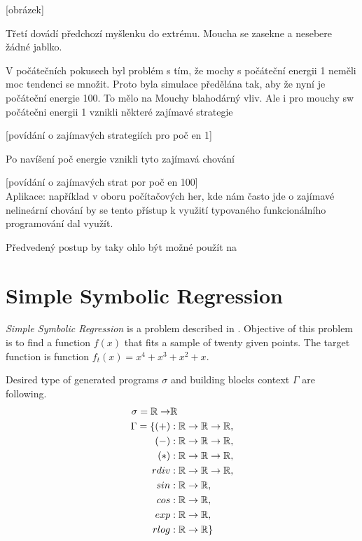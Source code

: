 \documentclass[12pt,a4paper]{report}
\begin{document}
[obrázek]

Třetí dovádí předchozí myšlenku do extrému. 
Moucha se zasekne a nesebere žádné jablko.


V počátečních pokusech byl problém s tím, že mochy s počáteční energii 1
neměli moc tendenci se množit. Proto byla simulace předělána tak, aby
že nyní je počáteční energie 100. To mělo na Mouchy blahodárný vliv.
Ale i pro mouchy sw počátečni energii 1 vznikli některé zajímavé strategie

[povídání o zajímavých strategiích pro poč en 1]

Po navíšení poč energie vznikli tyto zajímavá chování

[povídání o zajímavých strat por poč en 100]\\

Aplikace: například v oboru počítačových her, kde nám často jde o
zajímavé nelineární chování by se tento přístup k využití typovaného funkcionálního
programování dal využít.

Předvedený postup by taky ohlo být možné použít na 

\section{Simple Symbolic Regression}

\textit{Simple Symbolic Regression} is a problem described
in \cite{koza92}. Objective of this problem is to 
find a function $f(x)$ that fits a sample
of twenty given points. The target function is 
function $f_{t}(x) = x^4 + x^3 + x^2 + x$.  

Desired type of generated programs $\sigma$ and 
building blocks context $\Gamma$ are following.
\newcommand{\Real}{\mathbb{R}}
\begin{align*}
\sigma = \Real \ar &\Real\\
\Gamma = \{
  (+)  &: \Real \ar \Real \ar \Real    ,\\
  (-)  &: \Real \ar \Real \ar \Real    ,\\
  (*)  &: \Real \ar \Real \ar \Real    ,\\
  rdiv &: \Real \ar \Real \ar \Real    ,\\
  sin  &: \Real \ar \Real              ,\\
  cos  &: \Real \ar \Real              ,\\
  exp  &: \Real \ar \Real              ,\\ 
  rlog &: \Real \ar \Real              \}\\
\end{align*}
\end{document}
